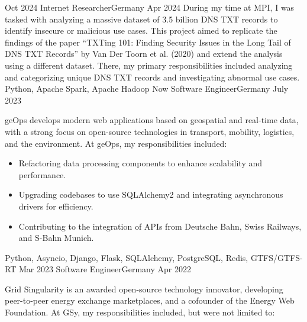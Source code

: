 %
%
%

\begin{experiences}
  \experience
    {Oct 2024} {Internet Researcher}{}{Germany}
    {Apr 2024} {
      During my time at MPI, I was tasked with analyzing a massive dataset of 3.5 billion DNS TXT records to identify insecure or malicious use cases. This project aimed to replicate the findings of the paper “TXTing 101: Finding Security Issues in the Long Tail of DNS TXT Records” by Van Der Toorn et al. (2020) and extend the analysis using a different dataset. There, my primary responsibilities included analyzing and categorizing unique DNS TXT records and investigating abnormal use cases.
    }
    {Python, Apache Spark, Apache Hadoop}
  \emptySeparator
  \experience
    {Now} {Software Engineer}{}{Germany}
    {July 2023} {
      geOps develops modern web applications based on geospatial and real-time data,
      with a strong focus on open-source technologies in transport, mobility, logistics,
      and the environment. At geOps, my responsibilities included:
      \begin{itemize}
        \item Refactoring data processing components to enhance scalability and performance.
        \item Upgrading codebases to use SQLAlchemy2 and integrating asynchronous drivers for efficiency.
        \item Contributing to the integration of APIs from Deutsche Bahn, Swiss Railways, and S-Bahn Munich.
      \end{itemize}
    }
    {Python, Asyncio, Django, Flask, SQLAlchemy, PostgreSQL, Redis, GTFS/GTFS-RT}
  \emptySeparator
  \experience
  {Mar 2023} {Software Engineer}{}{Germany}
  {Apr 2022} {
    Grid Singularity is an awarded open-source technology innovator,
    developing peer-to-peer energy exchange marketplaces, and a cofounder
    of the Energy Web Foundation. At GSy, my responsibilities included,
    but were not limited to:
    \begin{itemize}

\end{itemize}}
\end{experiences}
